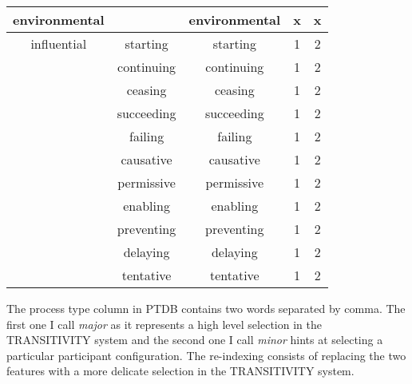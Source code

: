 \begin{table}[!ht]
{\begin{tabular}{|c|c|c|c|c|}
		environmental  &                 &     environmental     &          x           &          x           \\ \hline
		influential   &    starting     &       starting        &          1           &          2           \\ \hline
		&   continuing    &      continuing       &          1           &          2           \\ \hline
		&     ceasing     &        ceasing        &          1           &          2           \\ \hline
		&   succeeding    &      succeeding       &          1           &          2           \\ \hline
		&     failing     &        failing        &          1           &          2           \\ \hline
		&    causative    &       causative       &          1           &          2           \\ \hline
		&   permissive    &      permissive       &          1           &          2           \\ \hline
		&    enabling     &       enabling        &          1           &          2           \\ \hline
		&   preventing    &      preventing       &          1           &          2           \\ \hline
		&    delaying     &       delaying        &          1           &          2           \\ \hline
		&    tentative    &       tentative       &          1           &          2           \\ \hline
	\end{tabular}
}
\end{table}

The process type column in PTDB contains two words separated by comma. The first one I call \textit{major} as it represents a high level selection in the TRANSITIVITY system and the second one I call \textit{minor} hints at selecting a particular participant configuration. The re-indexing consists of replacing the two features with a more delicate selection in the TRANSITIVITY system. 


 